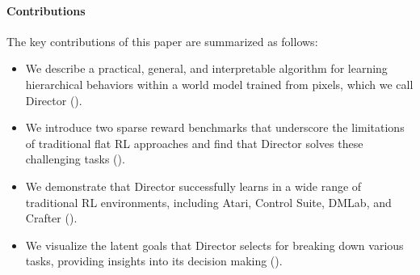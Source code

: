 \paragraph{Contributions}

The key contributions of this paper are summarized as follows:

\begin{itemize}
\item We describe a practical, general, and interpretable algorithm for learning hierarchical behaviors within a world model trained from pixels, which we call Director ().
\item We introduce two sparse reward benchmarks that underscore the limitations of traditional flat RL approaches and find that Director solves these challenging tasks ().
\item We demonstrate that Director successfully learns in a wide range of traditional RL environments, including Atari, Control Suite, DMLab, and Crafter ().
\item We visualize the latent goals that Director selects for breaking down various tasks, providing insights into its decision making ().
\end{itemize}